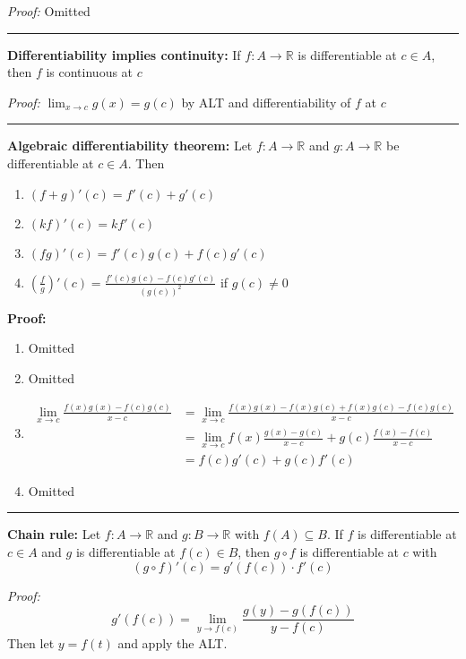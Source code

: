 \documentclass[12pt]{article}
\newcommand{\R}{\mathbb{R}}
\renewcommand{\hline}{\vspace*{10pt} \hrule \vspace*{10pt}}
\begin{document}
        \emph{Proof:} Omitted

    \hline 

    \textbf{Differentiability implies continuity:} If $f: A \to \R$ is differentiable at $c \in A$, then $f$ is continuous at $c$

        \emph{Proof:} $\lim_{x \to c} g(x) = g(c)$ by ALT and differentiability of $f$ at $c$

    \hline 

    \textbf{Algebraic differentiability theorem:} Let $f: A \to \R$ and $g: A \to \R$ be differentiable at $c \in A$. Then
    \begin{enumerate}
        \item $(f + g)'(c) = f'(c) + g'(c)$
        \item $(kf)'(c) = kf'(c)$
        \item $(fg)'(c) = f'(c)g(c) + f(c)g'(c)$
        \item $\left(\frac{f}{g}\right)'(c) = \frac{f'(c)g(c) - f(c)g'(c)}{(g(c))^2}$ if $g(c) \neq 0$
    \end{enumerate}

        \textbf{Proof:} 
        \begin{enumerate}
            \item Omitted 
            \item Omitted 
            \item \begin{align*}
                \lim_{x \to c} \frac{f(x)g(x) - f(c)g(c)}{x - c} &= \lim_{x \to c} \frac{f(x)g(x) - f(x)g(c) + f(x)g(c) - f(c)g(c)}{x - c} \\
                &= \lim_{x \to c} f(x)\frac{g(x) - g(c)}{x - c} + g(c)\frac{f(x) - f(c)}{x - c} \\
                &= f(c)g'(c) + g(c)f'(c)
            \end{align*}
            \item Omitted 
        \end{enumerate}

    \hline 

    \textbf{Chain rule:} Let $f: A \to \R$ and $g: B \to \R$ with $f(A) \subseteq B$. If $f$ is differentiable at $c \in A$ and $g$ is differentiable at $f(c) \in B$, then $g \circ f$ is differentiable at $c$ with 
    \[(g \circ f)'(c) = g'(f(c)) \cdot f'(c)\]

        \emph{Proof:} 
        \[g'(f(c)) = \lim_{y \to f(c)} \frac{g(y) - g(f(c))}{y - f(c)}\]
        Then let $y= f(t)$ and apply the ALT. 
\end{document}
